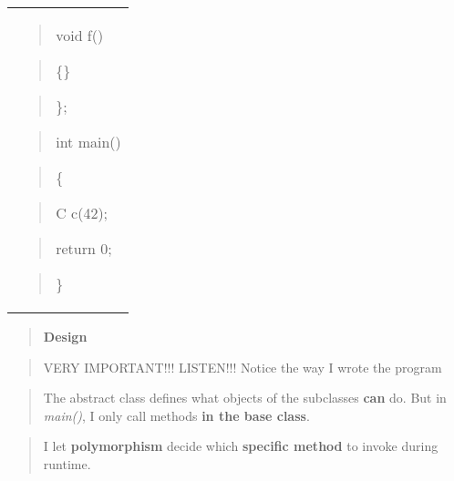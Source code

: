 \documentclass[
]{article}
\begin{document}
\begin{longtable}[]{@{}
  >{\raggedright\arraybackslash}p{}@{}}
\begin{quote}
void f()
\end{quote}

\begin{quote}
\{\}
\end{quote}

\begin{quote}
\};
\end{quote}

\begin{quote}
\end{quote}

\begin{quote}
int main()
\end{quote}

\begin{quote}
\{
\end{quote}

\begin{quote}
C c(42);
\end{quote}

\begin{quote}
return 0;
\end{quote}

\begin{quote}
\}
\end{quote} \\
\end{longtable}

\begin{quote}
\textbf{Design}
\end{quote}

\begin{quote}
\end{quote}

\begin{quote}
VERY IMPORTANT!!! LISTEN!!! Notice the way I wrote the program
\end{quote}

\begin{quote}
\end{quote}

\begin{quote}
The abstract class defines what objects of the subclasses \textbf{can}
do. But in \emph{main()}, I only call methods \textbf{in the base
class}.
\end{quote}

\begin{quote}
\end{quote}

\begin{quote}
I let \textbf{polymorphism} decide which \textbf{specific method} to
invoke during runtime.
\end{quote}
\end{document}
